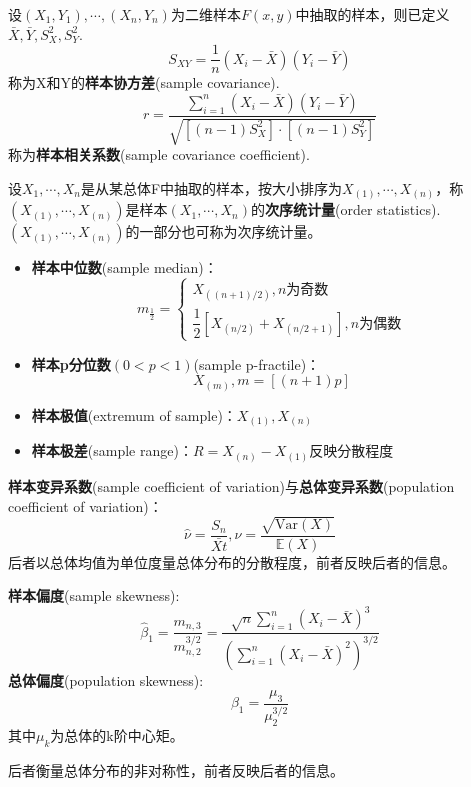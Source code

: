 \documentclass{ctexbook}
\begin{document}
\begin{definition}[二维随机向量的样本矩]
    设$(X_1,Y_1),\cdots,(X_n,Y_n)$为二维样本$F(x,y)$中抽取的样本，则已定义$\bar{X},\bar{Y},S^2_X,S_Y^2$.
    $$S_{XY}=\frac{1}{n}(X_i-\bar{X})(Y_i-\bar{Y})$$
    称为X和Y的\textbf{样本协方差}(sample covariance).
    $$r=\frac{\sum_{i=1}^n (X_i-\bar{X})(Y_i-\bar{Y})}{\sqrt{[(n-1)S_X^2]\cdot [(n-1)S_Y^2]}}$$
    称为\textbf{样本相关系数}(sample covariance coefficient).
\end{definition}

\begin{definition}
    设$X_1,\cdots,X_n$是从某总体F中抽取的样本，按大小排序为$X_{(1)},\cdots,X_{(n)}$，称$(X_{(1)},\cdots,X_{(n)})$是样本$(X_1,\cdots,X_n)$的\textbf{次序统计量}(order statistics).$(X_{(1)},\cdots,X_{(n)})$的一部分也可称为次序统计量。
\end{definition}

\begin{definition}
    \begin{itemize}
        \item \textbf{样本中位数}(sample median)：$$m_{\frac{1}{2}}=\begin{cases}
        X_{((n+1)/2)},n\text{为奇数}\\
        \dfrac{1}{2}[X_{(n/2)}+X_{(n/2+1)}],n\text{为偶数}
        \end{cases}$$
        \item \textbf{样本p分位数}$(0<p<1)$(sample p-fractile)：$$X_{(m)},m=[(n+1)p]$$
        \item \textbf{样本极值}(extremum of sample)：$X_{(1)},X_{(n)}$
        \item \textbf{样本极差}(sample range)：$R=X_{(n)}-X_{(1)}$反映分散程度
    \end{itemize}
\end{definition}

\begin{definition}
    \textbf{样本变异系数}(sample coefficient of variation)与\textbf{总体变异系数}(population coefficient of variation)：$$\hat{\nu}=\frac{S_n}{\bar{Xt}},\nu=\frac{\sqrt{\mathrm{Var}(X)}}{\mathbb{E} (X)}$$
    后者以总体均值为单位度量总体分布的分散程度，前者反映后者的信息。
\end{definition}

\begin{definition}
    \textbf{样本偏度}(sample skewness):
    $$\hat{\beta}_1=\frac{m_{n,3}}{m_{n,2}^{3/2}}=\frac{\sqrt{n}\sum_{i=1}^{n}(X_i-\bar{X})^3}{\left(\sum_{i=1}^n(X_i-\bar{X})^2\right)^{3/2}}$$
    \textbf{总体偏度}(population skewness):
    $$\beta_1=\frac{\mu_3}{\mu_2^{3/2}}$$
    其中$\mu_k$为总体的k阶中心矩。

    后者衡量总体分布的非对称性，前者反映后者的信息。
\end{definition}
\end{document}
